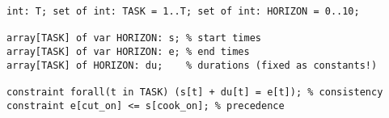 \pause \pause \pause \pause \pause

\begin{lstlisting}
int: T; set of int: TASK = 1..T; set of int: HORIZON = 0..10;

array[TASK] of var HORIZON: s; % start times
array[TASK] of var HORIZON: e; % end times 
array[TASK] of HORIZON: du;    % durations (fixed as constants!)

constraint forall(t in TASK) (s[t] + du[t] = e[t]); % consistency
constraint e[cut_on] <= s[cook_on]; % precedence
\end{lstlisting}
